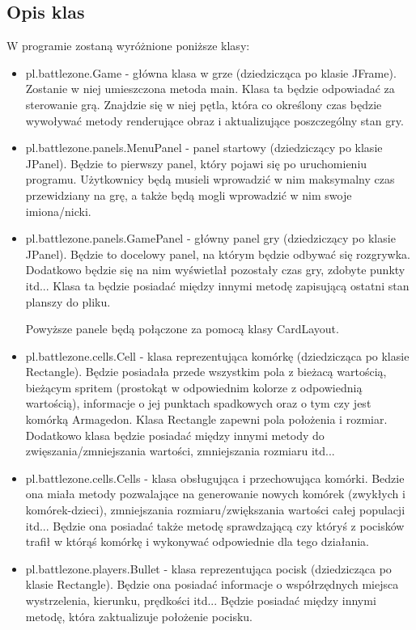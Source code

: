 \documentclass{article}
\begin{document}
\subsection{Opis klas}
W programie zostaną wyróżnione poniższe klasy:
\begin{itemize}
\item pl.battlezone.Game - główna klasa w grze (dziedzicząca po klasie JFrame). Zostanie w niej umieszczona metoda main. Klasa ta będzie odpowiadać za sterowanie grą. Znajdzie się w niej pętla, która co określony czas będzie wywoływać metody renderujące obraz i aktualizujące poszczególny stan gry.

\item pl.battlezone.panels.MenuPanel - panel startowy (dziedziczący po klasie JPanel). Będzie to pierwszy panel, który pojawi się po uruchomieniu programu. Użytkownicy będą musieli wprowadzić w nim maksymalny czas przewidziany na grę, a także będą mogli wprowadzić w nim swoje imiona/nicki.

\item pl.battlezone.panels.GamePanel - główny panel gry (dziedziczący po klasie JPanel). Będzie to docelowy panel, na którym będzie odbywać się rozgrywka. Dodatkowo będzie się na nim wyświetlał pozostały czas gry, zdobyte punkty itd... Klasa ta będzie posiadać między innymi metodę zapisującą ostatni stan planszy do pliku.

Powyższe panele będą połączone za pomocą klasy CardLayout.

\item pl.battlezone.cells.Cell - klasa reprezentująca komórkę (dziedzicząca po klasie Rectangle). Będzie posiadała przede wszystkim pola z bieżacą wartością, bieżącym spritem (prostokąt w odpowiednim kolorze z odpowiednią wartością), informacje o jej punktach spadkowych oraz o tym czy jest komórką Armagedon. Klasa Rectangle zapewni pola położenia i rozmiar. Dodatkowo klasa będzie posiadać między innymi metody do zwięszania/zmniejszania wartości, zmniejszania rozmiaru itd...

\item pl.battlezone.cells.Cells - klasa obsługująca i przechowująca komórki. Bedzie ona miała metody pozwalające na generowanie nowych komórek (zwykłych i komórek-dzieci), zmniejszania rozmiaru/zwiększania wartości całej populacji itd... Będzie ona posiadać także metodę sprawdzającą czy któryś z pocisków trafił w którąś komórkę i wykonywać odpowiednie dla tego działania.

\item pl.battlezone.players.Bullet - klasa reprezentująca pocisk (dziedzicząca po klasie Rectangle). Będzie ona posiadać informacje o współrzędnych miejsca wystrzelenia, kierunku, prędkości itd...
Będzie posiadać między innymi metodę, która zaktualizuje położenie pocisku.


\end{itemize}
\end{document}
